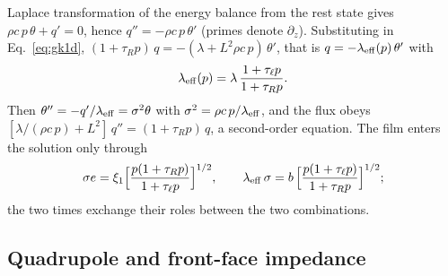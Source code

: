 Laplace transformation of the energy balance from the rest state gives $\rho c\,p\,\theta+q'=0$, hence
$q''=-\rho c\,p\,\theta'$ (primes denote $\partial_z$). Substituting in Eq.~\eqref{eq:gk1d},
$(1+\tau_Rp)\,q=-(\lambda+L^2\rho c\,p)\,\theta'$, that is $q=-\lambda_{\rm eff}(p)\,\theta'$ with
\begin{equation}
\lambda_{\rm eff}(p)=\lambda\,\frac{1+\tau_\ell p}{1+\tau_Rp}.
\label{eq:lameff}
\end{equation}
Then $\theta''=-q'/\lambda_{\rm eff}=\sigma^2\theta$ with $\sigma^2=\rho c\,p/\lambda_{\rm eff}$, and the
flux obeys $[\lambda/(\rho c\,p)+L^2]\,q''=(1+\tau_Rp)\,q$, a second-order equation. The film enters
the solution only through
\begin{equation}
\sigma e=\xi_1\Big[\frac{p(1+\tau_Rp)}{1+\tau_\ell p}\Big]^{1/2},\qquad
\lambda_{\rm eff}\,\sigma=b\,\Big[\frac{p(1+\tau_\ell p)}{1+\tau_Rp}\Big]^{1/2};
\label{eq:combinations}
\end{equation}
the two times exchange their roles between the two combinations.

\subsection{Quadrupole and front-face impedance}\label{sec:quadrupole}

